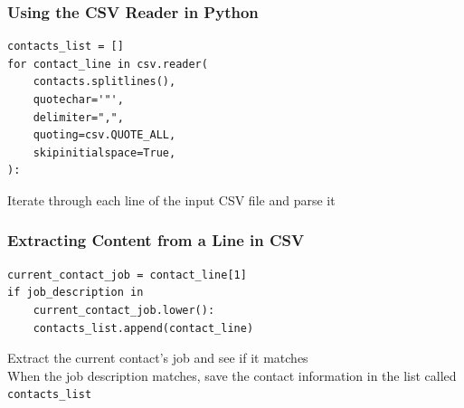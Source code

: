 \documentclass[14pt,aspectratio=169]{beamer}
\begin{document}
%
\begin{frame}[fragile]
  \frametitle{Using the CSV Reader in Python}
  \normalsize
  \begin{minipage}{6in}
    \vspace*{.25in}
    \begin{verbatim}
contacts_list = []
for contact_line in csv.reader(
    contacts.splitlines(),
    quotechar='"',
    delimiter=",",
    quoting=csv.QUOTE_ALL,
    skipinitialspace=True,
):
    \end{verbatim}
  \end{minipage}
  \vspace*{.1in}
  \begin{center}
    \normalsize \noindent Iterate through each line of the input CSV file and
    parse it\\
  \end{center}
\end{frame}

%
\begin{frame}[fragile]
  \frametitle{Extracting Content from a Line in CSV}
  \normalsize
  \begin{minipage}{6in}
    \vspace*{.25in}
    \begin{verbatim}
current_contact_job = contact_line[1]
if job_description in
    current_contact_job.lower():
    contacts_list.append(contact_line)
    \end{verbatim}
  \end{minipage}
  \vspace*{.1in}
  \begin{center}
    \normalsize \noindent Extract the current contact's job and see if it
    matches \\
    \normalsize \noindent When the job description matches, save the contact
    information in the list called {\tt contacts\_list}\\
  \end{center}
\end{frame}
\end{document}

